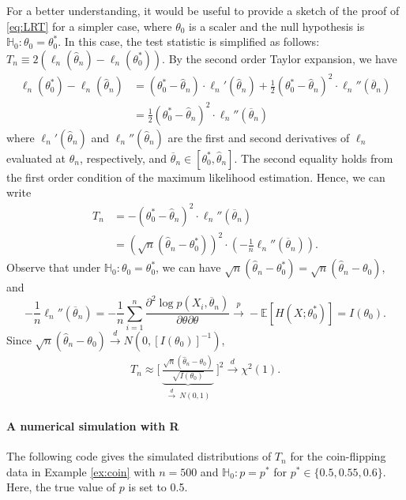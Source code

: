 \documentclass[10.5pt, A4paper, openany, uplatex]{book}
\newcommand{\mbb}{\mathbb}
\newcommand{\E}{\mathbb{E}}
\renewcommand{\hat}{\widehat}
\renewcommand{\bar}{\overline}
\numberwithin{equation}{section}
\begin{document}
For a better understanding, it would be useful to provide a sketch of the proof of \eqref{eq:LRT} for a simpler case, where $\theta_0$ is a scaler and the null hypothesis is $\mbb{H}_0: \theta_0 = \theta_0^*$.
In this case, the test statistic is simplified as follows: $T_n \equiv 2\left(\ell_n(\hat \theta_n) - \ell_n(\theta_0^*) \right)$.
By the second order Taylor expansion, we have
\begin{align*}
	\ell_n(\theta_0^*) - \ell_n(\hat \theta_n)
	& =  (\theta_0^* - \hat \theta_n) \cdot \ell_n'(\hat \theta_n) + \frac{1}{2}(\theta_0^* - \hat \theta_n)^2 \cdot \ell_n''(\bar \theta_n)\\
	& = \frac{1}{2}(\theta_0^* - \hat \theta_n)^2 \cdot \ell_n''(\bar \theta_n)
\end{align*}
where $\ell_n'(\hat \theta_n)$ and $\ell_n''(\hat \theta_n)$ are the first and second derivatives of $\ell_n$ evaluated at $\hat \theta_n$, respectively, and $\bar \theta_n \in [\theta_0^*, \hat \theta_n]$.
The second equality holds from the first order condition of the maximum likelihood estimation.
Hence, we can write
\begin{align*}
	T_n 
	& = -(\theta_0^* - \hat \theta_n)^2 \cdot \ell_n''(\bar \theta_n)\\
	& =  (\sqrt{n}(\hat \theta_n - \theta_0^*))^2 \cdot \left( - \frac{1}{n}\ell_n''(\bar \theta_n) \right).
\end{align*}
Observe that under $\mbb{H}_0: \theta_0 = \theta_0^*$, we can have $\sqrt{n}(\hat \theta_n - \theta_0^*) = \sqrt{n}(\hat \theta_n - \theta_0)$, and
\[
	-\frac{1}{n} \ell_n''(\bar \theta_n) = -\frac{1}{n} \sum_{i=1}^n \frac{\partial^2 \log p(X_i, \bar \theta_n)}{\partial \theta \partial \theta} \overset{p}{\to} -\E[H(X; \theta_0^*)] = I(\theta_0).
\]
Since $\sqrt{n}(\hat \theta_n - \theta_0) \overset{d}{\to} N(0, [I(\theta_0)]^{-1})$, 
\begin{align*}
	T_n \approx \Bigg[ \: \underbrace{\frac{\sqrt{n}(\hat \theta_n - \theta_0)}{\sqrt{I(\theta_0)}}}_{\overset{d}{\to} \: N(0,1)} \: \Bigg]^2 \overset{d}{\to} \chi^2(1).
\end{align*}


\paragraph{A numerical simulation with R}
The following code gives the simulated distributions of $T_n$ for the coin-flipping data in Example \ref{ex:coin} with $n = 500$ and $\mbb{H}_0: p = p^*$ for $p^* \in \{0.5, 0.55, 0.6\}$.
Here, the true value of $p$ is set to 0.5.
\end{document}
